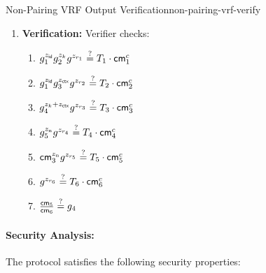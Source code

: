 \begin{protocol}{Non-Pairing VRF Output Verification}{non-pairing-vrf-verify}
\begin{enumerate}
    \item \textbf{Verification:} Verifier checks:
    \begin{enumerate}[label=(\roman*)]
        \item $g_1^{z_{\mathsf{id}}} g_2^{z_k} g^{z_{r_1}} \stackrel{?}{=} T_1 \cdot \mathsf{cm}_1^c$
        \item $g_1^{z_{\mathsf{id}}} g_3^{z_{\mathsf{ctx}}} g^{z_{r_2}} \stackrel{?}{=} T_2 \cdot \mathsf{cm}_2^c$
        \item $g_4^{z_k + z_{\mathsf{ctx}}} g^{z_{r_3}} \stackrel{?}{=} T_3 \cdot \mathsf{cm}_3^c$
        \item $g_5^{z_{\text{n}}} g^{z_{r_4}} \stackrel{?}{=} T_4 \cdot \mathsf{cm}_4^c$
        \item $\mathsf{cm}_3^{z_{\text{n}}} g^{z_{r_5}} \stackrel{?}{=} T_5 \cdot \mathsf{cm}_5^c$
        \item $g^{z_{r_6}} \stackrel{?}{=} T_6 \cdot \mathsf{cm}_6^c$
        \item $\frac{\mathsf{cm}_5}{\mathsf{cm}_6} \stackrel{?}{=} g_4$
    \end{enumerate}
\end{enumerate}
\end{protocol}








\newpage
\paragraph{Security Analysis:}
The protocol satisfies the following security properties:

